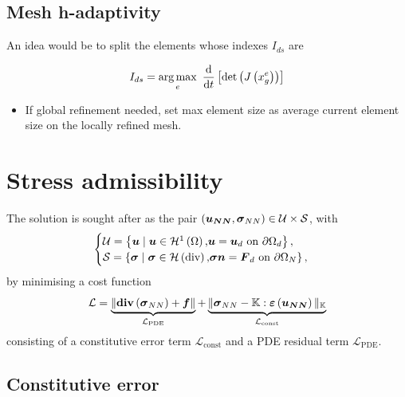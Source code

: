\subsection{Mesh h-adaptivity}

An idea would be to split the elements whose indexes $I_{ds}$ are

\begin{equation}
	I_{ds} = \operatorname*{arg\,max}_{e}~\frac{\mathrm{d}}{\mathrm{d}t} \left[ \text{det}\left(J\left(x^e_g\right)\right)\right]
\end{equation}

\begin{itemize}
	\item If global refinement needed, set max element size as average current element size on the locally refined mesh.
\end{itemize}


\newpage
\section{Stress admissibility}
The solution is sought after as the pair $\left(\boldsymbol{u_{NN}},\mathcal{\boldsymbol{\sigma}}_{NN}\right) \in \mathcal{U}  \times \mathcal{S}$, with
\begin{equation}
	\begin{cases}
	\mathcal{U} = \left\{\boldsymbol{u} \; | \; \boldsymbol{u}\in \mathcal{H}^1\left(\Omega\right)\text{,} 
	\boldsymbol{u} = \boldsymbol{u}_d \text{ on } \partial \Omega_d \right\}, \\
		\mathcal{S} = \left\{\mathcal{\boldsymbol{\sigma}} \; | \; \mathcal{\boldsymbol{\sigma}}\in \mathcal{H}\left(\text{div}\right)\text{,} 
	\mathcal{\boldsymbol{\sigma}}\boldsymbol{n} = \boldsymbol{F}_d \text{ on } \partial \Omega_N \right\}, 
	\end{cases}
\end{equation}
by minimising a cost function 
\begin{equation}
	\mathcal{L} = \underbrace{\Vert \text{\textbf{div}}\left(\mathcal{\boldsymbol{\sigma}}_{NN}\right)+\boldsymbol{f}\Vert}_{\mathcal{L}_{\text{PDE}}} + \underbrace{ \Vert \mathcal{\boldsymbol{\sigma}}_{NN} - \mathbb{K}:\mathcal{\boldsymbol{\varepsilon}}\left(\boldsymbol{u_{NN}}\right) \Vert_{\mathbb{K}}}_{\mathcal{L}_{\text{const}}}
\end{equation} consisting of a constitutive error term $\mathcal{L}_{\text{const}}$ and a PDE residual term $\mathcal{L}_{\text{PDE}}$.
\subsection{Constitutive error}
